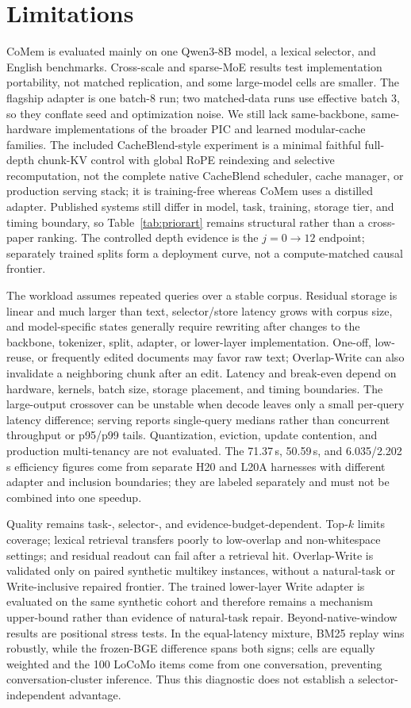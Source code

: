 \section*{Limitations}

CoMem is evaluated mainly on one Qwen3-8B model, a lexical selector, and English
benchmarks. Cross-scale and sparse-MoE results test implementation portability,
not matched replication, and some large-model cells are smaller. The flagship
adapter is one batch-8 run; two matched-data runs use effective batch 3, so they
conflate seed and optimization noise. We still lack same-backbone,
same-hardware implementations of the broader PIC and learned modular-cache
families. The included CacheBlend-style experiment is a minimal faithful
full-depth chunk-KV control with global RoPE reindexing and selective
recomputation, not the complete native CacheBlend scheduler, cache manager, or
production serving stack; it is training-free whereas CoMem uses a distilled
adapter. Published systems still differ in model, task, training, storage tier,
and timing boundary, so Table~\ref{tab:priorart} remains structural rather than
a cross-paper ranking. The controlled depth evidence is the
$j{=}0\!\rightarrow\!12$ endpoint; separately trained splits form a deployment
curve, not a compute-matched causal frontier.

The workload assumes repeated queries over a stable corpus. Residual storage is
linear and much larger than text, selector/store latency grows with corpus size,
and model-specific states generally require rewriting after changes to the
backbone, tokenizer, split, adapter, or lower-layer implementation. One-off,
low-reuse, or frequently edited documents may favor raw text; Overlap-Write can
also invalidate a neighboring chunk after an edit. Latency and break-even depend
on hardware, kernels, batch size, storage placement, and timing boundaries. The
large-output crossover can be unstable when decode leaves only a small
per-query latency difference; serving reports single-query medians rather than
concurrent throughput or p95/p99 tails. Quantization,
eviction, update contention, and production multi-tenancy are not evaluated.
The 71.37\,s, 50.59\,s, and 6.035/2.202\,s efficiency figures come from
separate H20 and L20A harnesses with different adapter and inclusion boundaries;
they are labeled separately and must not be combined into one speedup.

Quality remains task-, selector-, and evidence-budget-dependent. Top-$k$ limits
coverage; lexical retrieval transfers poorly to low-overlap and non-whitespace
settings; and residual readout can fail after a retrieval hit. Overlap-Write is
validated only on paired synthetic multikey instances, without a natural-task or
Write-inclusive repaired frontier. The trained lower-layer Write adapter is
evaluated on the same synthetic cohort and therefore remains a mechanism
upper-bound rather than evidence of natural-task repair. Beyond-native-window results are positional
stress tests. In the equal-latency mixture, BM25 replay wins robustly, while the
frozen-BGE difference spans both signs; cells are equally weighted and the 100
LoCoMo items come from one conversation, preventing conversation-cluster
inference. Thus this diagnostic does not establish a selector-independent
advantage.

